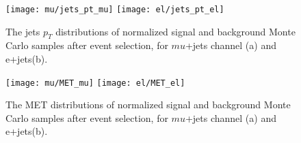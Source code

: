 \begin{figure}[htb]
\texttt{[image: mu/jets\_pt\_mu]}
\texttt{[image: el/jets\_pt\_el]}
\centering
\caption{\small \small The jets $p_T$ distributions of normalized signal and background Monte Carlo samples after event selection, for $mu$+jets channel (a) and e+jets(b). }
\label{fig:jets_pt}
\end{figure}

\begin{figure}[htb]
\texttt{[image: mu/MET\_mu]}
\texttt{[image: el/MET\_el]}
\centering
\caption{\small \small The MET distributions of normalized signal and background Monte Carlo samples after event selection, for $mu$+jets channel (a) and e+jets(b). }
\label{fig:met}
\end{figure}

